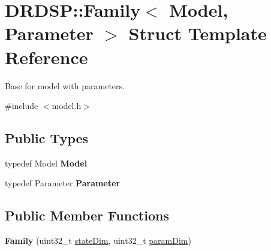 \hypertarget{struct_d_r_d_s_p_1_1_family}{\section{D\-R\-D\-S\-P\-:\-:Family$<$ Model, Parameter $>$ Struct Template Reference}
\label{struct_d_r_d_s_p_1_1_family}
}


Base for model with parameters.  




{\ttfamily \#include $<$model.\-h$>$}

\subsection*{Public Types}
\begin{DoxyCompactItemize}
\item 
\hypertarget{struct_d_r_d_s_p_1_1_family_a4b95d783ae1e4463682c8a6d2d92ba60}{typedef Model {\bfseries Model}}\label{struct_d_r_d_s_p_1_1_family_a4b95d783ae1e4463682c8a6d2d92ba60}

\item 
\hypertarget{struct_d_r_d_s_p_1_1_family_a7c850dabdb267d80256d7550f040d800}{typedef Parameter {\bfseries Parameter}}\label{struct_d_r_d_s_p_1_1_family_a7c850dabdb267d80256d7550f040d800}

\end{DoxyCompactItemize}
\subsection*{Public Member Functions}
\begin{DoxyCompactItemize}
\item 
\hypertarget{struct_d_r_d_s_p_1_1_family_a0b5f28ba5ff22b3e39508dc7759b87ad}{{\bfseries Family} (uint32\-\_\-t \hyperlink{struct_d_r_d_s_p_1_1_family_ae2e7aabde5a620540f4771f1fac6da78}{state\-Dim}, uint32\-\_\-t \hyperlink{struct_d_r_d_s_p_1_1_family_a364eac2f469c96b1584ffbd66ea49e81}{param\-Dim})}\label{struct_d_r_d_s_p_1_1_family_a0b5f28ba5ff22b3e39508dc7759b87ad}

\end{DoxyCompactItemize}

